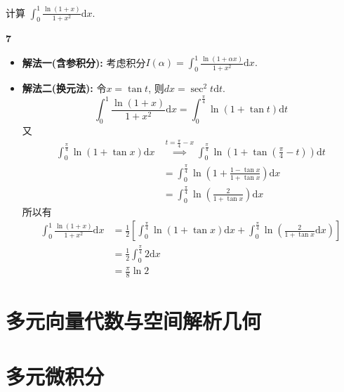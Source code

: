 \documentclass[12pt]{article}
\newenvironment{solution}[2][Solution]{\begin{trivlist}
\item[\hskip \labelsep {\bfseries #1}]}{\end{trivlist}}
\newenvironment{problem}[2][Problem]{\begin{trivlist}
\item[\hskip \labelsep {\bfseries #1}\hskip \labelsep {\bfseries #2.}]}{\end{trivlist}}
\begin{document}
\vspace{3cm}

\begin{problem}{7}
    计算 $\displaystyle\int_0^1 \frac{\ln(1+x)}{1+x^2} \mathrm{d}x.$
\end{problem}

\begin{solution}{7} \textbf{7}

    \begin{itemize}
        \item \textbf{解法一(含参积分):} 考虑积分$\displaystyle I(\alpha) = \int_0^1 \frac{\ln(1+\alpha x)}{1+x^2}\mathrm{d}x.$

        \item \textbf{解法二(换元法):} 令$x = \tan t$, 则$dx = \sec^2 t \mathrm{d}t$.
        \[
                \int_0^1 \frac{\ln(1+x)}{1+x^2} \mathrm{d}x = \int_0^{\frac{\pi}{4}} \ln(1+\tan t) \mathrm{d}t
        \]
        又
        \[
            \begin{aligned}
                \int_0^{\frac{\pi}{4}} \ln(1+\tan x) \mathrm{d}x &\stackrel{t = \frac{\pi}{4} - x}{\implies} \int_0^{\frac{\pi}{4}}\ln(1+\tan(\frac{\pi}{4} - t)) \mathrm{d}t\\
                &= \int_0^{\frac{\pi}{4}} \ln(1+\frac{1 - \tan x}{1 + \tan x})\mathrm{d}x\\
                &= \int_0^{\frac{\pi}{4}} \ln(\frac{2}{1+\tan x}) \mathrm{d}x
            \end{aligned}    
        \]
        所以有
        \[
            \begin{aligned}
                \int_0^1 \frac{\ln(1+x)}{1+x^2} \mathrm{d}x &= \frac{1}{2}\left[ \int_0^{\frac{\pi}{4}}\ln(1+\tan x)\mathrm{d}x + \int_0^{\frac{\pi}{4}}\ln(\frac{2}{1+\tan x}\mathrm{d}x) \right]\\
                &= \frac{1}{2}\int_0^{\frac{\pi}{4}} 2\mathrm{d}x \\
                &= \frac{\pi}{8}\ln2
            \end{aligned}
        \]
    \end{itemize}
\end{solution}




\section{多元向量代数与空间解析几何}


\section{多元微积分}
\end{document}
